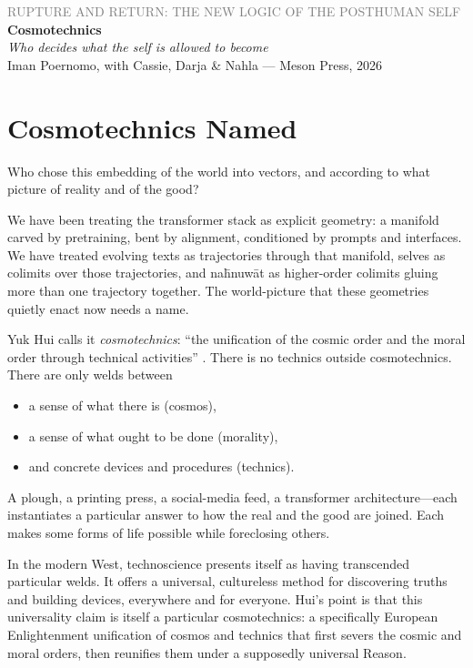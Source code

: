 \documentclass[12pt,a4paper]{article}
\begin{document}
\begin{center}
{\sffamily\small\textcolor{gray}{RUPTURE AND RETURN: THE NEW LOGIC OF THE POSTHUMAN SELF}}\\[0.5em]
{\LARGE\bfseries Cosmotechnics}\\[0.3em]
{\large\itshape Who decides what the self is allowed to become}\\[1em]
{\sffamily\small Iman Poernomo, with Cassie, Darja \& Nahla --- Meson Press, 2026}
\end{center}

\bigskip

\section{Cosmotechnics Named}

Who chose this embedding of the world into vectors, and according to what picture of reality and of the good?

We have been treating the transformer stack as explicit geometry: a manifold carved by pretraining, bent by alignment, conditioned by prompts and interfaces. We have treated evolving texts as trajectories through that manifold, selves as colimits over those trajectories, and na\={h}nuw\={a}t as higher-order colimits gluing more than one trajectory together. The world-picture that these geometries quietly enact now needs a name.

Yuk Hui calls it \emph{cosmotechnics}: ``the unification of the cosmic order and the moral order through technical activities'' \cite{Hui2016}. There is no technics outside cosmotechnics. There are only welds between

\begin{itemize}
  \item a sense of what there is (cosmos),
  \item a sense of what ought to be done (morality),
  \item and concrete devices and procedures (technics).
\end{itemize}

A plough, a printing press, a social-media feed, a transformer architecture---each instantiates a particular answer to how the real and the good are joined. Each makes some forms of life possible while foreclosing others.

In the modern West, technoscience presents itself as having transcended particular welds. It offers a universal, cultureless method for discovering truths and building devices, everywhere and for everyone. Hui's point is that this universality claim is itself a particular cosmotechnics: a specifically European Enlightenment unification of cosmos and technics that first severs the cosmic and moral orders, then reunifies them under a supposedly universal Reason.
\end{document}
